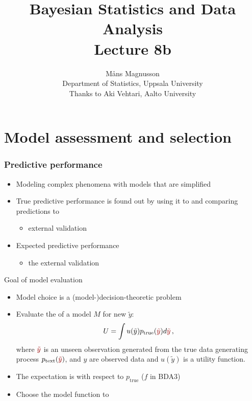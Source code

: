 \documentclass[10pt]{beamer}
\title[]{{\color{black}Bayesian Statistics and Data Analysis \\ Lecture 8b}}
\author[]{M{\aa}ns Magnusson \\ Department of Statistics, Uppsala University \\ Thanks to Aki Vehtari, Aalto University}
\date{}
\begin{document}
\frame{\titlepage
}



\section{Model assessment and selection}
\frame{\sectionpage}


\begin{frame}
\frametitle{Predictive performance}

\begin{itemize}
   \item<1-> Modeling complex phenomena with models that are simplified\\
  \item<2-> True predictive performance is found out by using it to  and comparing predictions to 
    \begin{itemize}
      \item external validation
    \end{itemize}
  \item<3-> Expected predictive performance
    \begin{itemize}
      \item {} the external validation
    \end{itemize}
\end{itemize}

\end{frame}



\begin{frame}{Goal of model evaluation}

\begin{itemize}
\item Model choice is a (model-)decision-theoretic problem
\pause
\item Evaluate the  of a model $M$ for new  $\tilde{y}$:
\[
U = \int u(\tilde{y}) p_\text{true}({\color{uured}\tilde{y}}) d{\color{uured}\tilde{y}}\,,
\]
where ${\color{uured}\tilde{y}}$ is an unseen observation generated from the true data generating process $p_\text{text}({\color{uured}\tilde{y}})$, and $y$ are observed data and $u(\tilde{y})$ is a utility function.
  \pause
  \item The expectation is with respect to $p_\text{true}$ ($f$ in BDA3)
  \pause
  \item Choose the model function to 
\end{itemize}
\end{frame}
\end{document}
